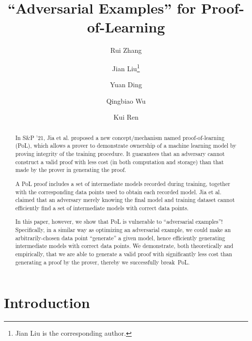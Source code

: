 \documentclass[conference]{IEEEtran}
\begin{document}
\title{``Adversarial Examples'' for Proof-of-Learning}







\author{Rui Zhang}
\author{Jian Liu\thanks{Jian Liu is the corresponding author.}}
\author{Yuan Ding}
\author{Qingbiao Wu}
\author{Kui Ren}


\maketitle


\begin{abstract}
In S\&P '21, Jia et al. proposed a new concept/mechanism named proof-of-learning (PoL), which allows a prover to demonstrate ownership of a machine learning model by  proving integrity of the training procedure.
It guarantees that an adversary cannot construct a valid proof with less cost (in both computation and storage) than that made by the prover in generating the proof. 

A PoL proof includes a set of intermediate models recorded during training, together with the corresponding data points used to obtain each recorded model.
Jia et al. claimed that an adversary merely knowing the final model and training dataset cannot efficiently find a set of intermediate models with correct data points.

In this paper, however, we show that PoL is vulnerable to ``adversarial examples''! 
Specifically, in a similar way as optimizing an adversarial example, we could make an arbitrarily-chosen data point ``generate'' a given model, hence efficiently generating intermediate models with correct data points.
We demonstrate, both theoretically and empirically, that we are able to generate a valid proof with significantly less cost than generating a proof by the prover, thereby we successfully break~PoL.

 \end{abstract}









\section{Introduction}
\end{document}
